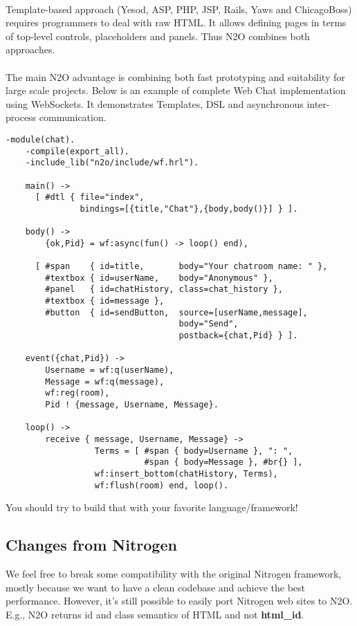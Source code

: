 \paragraph{}
Template-based approach (Yesod, ASP, PHP, JSP, Rails, Yaws and ChicagoBoss)
requires programmers to deal with raw HTML. It allows
defining pages in terms of top-level controls, placeholders
and panels. Thus N2O combines both approaches.

\paragraph{}
The main N2O advantage is combining both fast prototyping and suitability for large
scale projects. Below is an example of complete Web Chat implementation using
WebSockets. It demonstrates Templates, DSL and asynchronous
inter-process communication.

\newpage
\begin{lstlisting}[caption=chat.erl]
    -module(chat).
    -compile(export_all).
    -include_lib("n2o/include/wf.hrl").

    main() -> 
      [ #dtl { file="index", 
               bindings=[{title,"Chat"},{body,body()}] } ].

    body() ->
        {ok,Pid} = wf:async(fun() -> loop() end),

      [ #span    { id=title,       body="Your chatroom name: " }, 
        #textbox { id=userName,    body="Anonymous" },
        #panel   { id=chatHistory, class=chat_history },
        #textbox { id=message },
        #button  { id=sendButton,  source=[userName,message],
                                   body="Send", 
                                   postback={chat,Pid} } ].

    event({chat,Pid}) ->
        Username = wf:q(userName),
        Message = wf:q(message),
        wf:reg(room),
        Pid ! {message, Username, Message}.

    loop() ->
        receive { message, Username, Message} ->
                  Terms = [ #span { body=Username }, ": ",
                            #span { body=Message }, #br{} ],
                  wf:insert_bottom(chatHistory, Terms),
                  wf:flush(room) end, loop().
\end{lstlisting}

You should try to build that with your favorite language/framework!

\subsection*{Changes from Nitrogen}
We feel free to break some compatibility with the original
Nitrogen framework, mostly because we want to have a clean codebase
and achieve the best performance. However, it's still possible to easily port
Nitrogen web sites to N2O. E.g., N2O returns id and class semantics
of HTML and not {\bf html\_id}.

